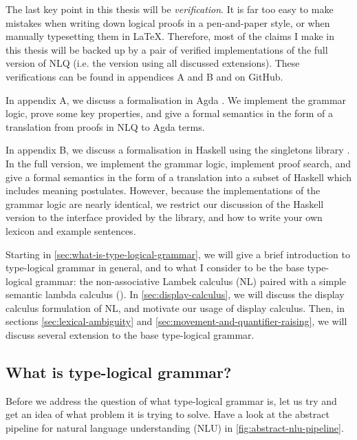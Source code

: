 The last key point in this thesis will be \emph{verification}. It is
far too easy to make mistakes when writing down logical proofs in a
pen-and-paper style, or when manually typesetting them in
\LaTeX. Therefore, most of the claims I make in this thesis will be
backed up by a pair of verified implementations of the full version
of NLQ (i.e. the version using all discussed extensions).
These verifications can be found in appendices A and B and on GitHub.

In appendix A, we discuss a formalisation in Agda \citep{norell2009}.
We implement the grammar logic, prove some key properties, and give a
formal semantics in the form of a translation from proofs in NLQ to
Agda terms.

In appendix B, we discuss a formalisation in Haskell
\citep{marlow2010} using the singletons library
\citet{eisenberg2012}. In the full version, we implement the grammar
logic, implement proof search, and give a formal semantics in the form
of a translation into a subset of Haskell which includes meaning
postulates. However, because the implementations of the grammar logic
are nearly identical, we restrict our discussion of the Haskell
version to the interface provided by the library, and how to write
your own lexicon and example sentences.

Starting in \autoref{sec:what-is-type-logical-grammar}, we will give a
brief introduction to type-logical grammar in general, and to what I
consider to be the base type-logical grammar: the non-associative
Lambek calculus (NL) paired with a simple semantic lambda calculus
(\lamET).
In \autoref{sec:display-calculus}, we will discuss the display
calculus formulation of NL, and motivate our usage of display
calculus.
Then, in sections \ref{sec:lexical-ambiguity} and
\ref{sec:movement-and-quantifier-raising}, we will discuss several
extension to the base type-logical grammar.

\subsection{What is type-logical grammar?}
\label{sec:what-is-type-logical-grammar}

Before we address the question of what type-logical grammar is, let us
try and get an idea of what problem it is trying to solve. Have a look
at the abstract pipeline for natural language understanding (NLU) in
\autoref{fig:abstract-nlu-pipeline}.



